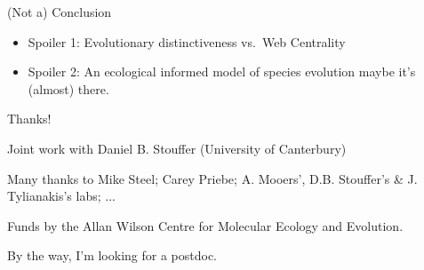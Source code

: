 \documentclass[ignorenonframetext,]{beamer}
\begin{document}
\begin{frame}{(Not a) Conclusion}

\begin{itemize}[<+->]
\item
  Spoiler 1: Evolutionary distinctiveness vs.~Web Centrality
\item
  Spoiler 2: An ecological informed model of species evolution maybe
  it's (almost) there.
\end{itemize}

\end{frame}

\begin{frame}{Thanks!}

\begin{centering}

Joint work with  
Daniel B. Stouffer (University of Canterbury)

Many thanks to  
Mike Steel; Carey Priebe; A. Mooers', D.B. Stouffer's \& J. Tylianakis's labs; ...

Funds by the Allan Wilson Centre for Molecular Ecology and Evolution.

\vspace{2cm}

\small{By the way, I'm looking for a postdoc.}

\end{centering}

\end{frame}
\end{document}
